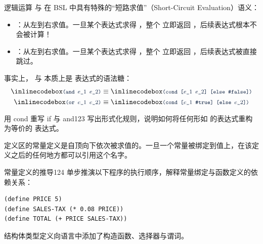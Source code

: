 逻辑运算  与  在 BSL 中具有特殊的“短路求值”（Short-Circuit Evaluation）语义：
\begin{itemize}
  \item {}：从左到右求值。一旦某个表达式求得 ，整个  立即返回 ，后续表达式根本不会被计算！
  \item {}：从左到右求值。一旦某个表达式求得 ，整个  立即返回 ，后续表达式被直接跳过。
\end{itemize}

事实上， 与  本质上是  表达式的语法糖：
\begin{align*}
\code{(and $e\_1$ $e\_2$)} &\equiv \code{(cond [$e\_1$ $e\_2$] [else \#false])} \\
\code{(or $e\_1$ $e\_2$)}  &\equiv \code{(cond [$e\_1$ \#true] [else $e\_2$])}
\end{align*}

\begin{exercise}{用 cond 重写 if 与 and}{123}
写出形式化规则，说明如何将任何形如  的表达式重构为等价的  表达式。
\end{exercise}

\label{sec:int01_constant_definitions}

定义区的常量定义是自顶向下依次被求值的。一旦一个常量被绑定到值上，在该定义之后的任何地方都可以引用这个名字。

\begin{exercise}{常量定义的推导}{124}
单步推演以下程序的执行顺序，解释常量绑定与函数定义的依赖关系：
\begin{lstlisting}[language=BSL]
(define PRICE 5)
(define SALES-TAX (* 0.08 PRICE))
(define TOTAL (+ PRICE SALES-TAX))
\end{lstlisting}
\end{exercise}

\label{sec:int01_structure_type_definitions}

结构体类型定义向语言中添加了构造函数、选择器与谓词。

